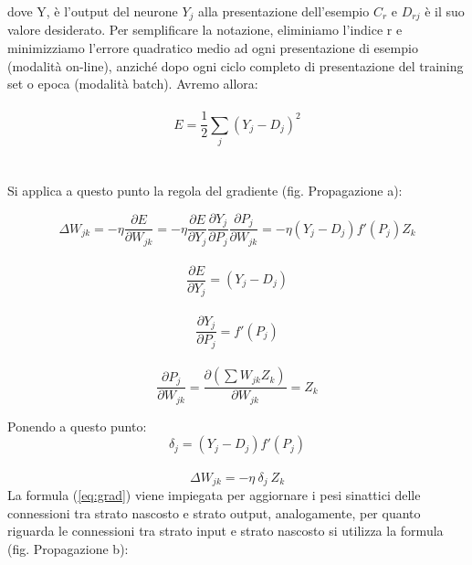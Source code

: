 \documentclass[10pt,a4paper]{article}
\begin{document}
dove Y, è l'output del neurone $Y_j$ alla presentazione dell'esempio $C_r$ e $D_{rj}$ è il
suo valore desiderato. Per semplificare la notazione, eliminiamo l'indice r e minimizziamo l'errore quadratico medio ad ogni presentazione di esempio (modalità on-line), anziché dopo ogni ciclo completo di presentazione del training set
o epoca (modalità batch). Avremo allora:
\\ \\
\begin{equation} \label{eq:eq}
E = \frac{1}{2} \sum_j{(Y_{j} - D_{j})^2}
\end{equation}
\\ \\
Si applica a questo punto la regola del gradiente (fig. Propagazione a):

\begin{equation} 
\label{eq:grad}
\Delta W_{jk} = - \eta \frac{\partial E}{\partial W_{jk}} = - \eta \frac{\partial E}{\partial Y_j} \frac{\partial Y_j}{\partial P_j} \frac{\partial P_j}{\partial W_{jk}} = 
-\eta(Y_j - D_j)f'(P_j)Z_k
\end{equation} \\
\begin{equation} \label{eq:dey}
\frac{\partial E}{\partial Y_j} = (Y_j - D_j)
\end{equation} \\
\begin{equation} \label{eq:dyp}
\frac{\partial Y_j}{\partial P_j} = f'(P_j) 
\end{equation} \\
\begin{equation} \label{eq:dpw}
\frac{\partial P_j}{\partial W_{jk}} = \frac{\partial(\sum W_{jk} Z_k)}{\partial W_{jk}} = Z_k
\end{equation}

Ponendo a questo punto:
\begin{equation} \label{eq:cr}
\delta_j = (Y_j - D_j)f'(P_j) 
\end{equation}
\\
\begin{equation} \label{eq:gradcr}
\Delta W_{jk} = -\eta \ \delta_j \ Z_k
\end{equation}
La formula (\ref{eq:grad}) viene impiegata per aggiornare i pesi sinattici delle connessioni tra strato nascosto e strato output, analogamente, per quanto riguarda le connessioni tra strato input e strato nascosto si utilizza la formula (fig. Propagazione b):
\end{document}
